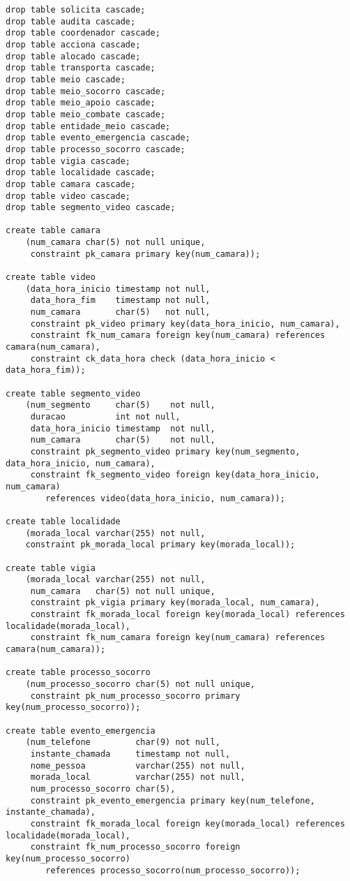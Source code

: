 \documentclass[10pt,a4paper]{article}
\begin{document}
\begin{verbatim}
drop table solicita cascade;
drop table audita cascade;
drop table coordenador cascade;
drop table acciona cascade;
drop table alocado cascade;
drop table transporta cascade;
drop table meio cascade;
drop table meio_socorro cascade;
drop table meio_apoio cascade;
drop table meio_combate cascade;
drop table entidade_meio cascade;
drop table evento_emergencia cascade;
drop table processo_socorro cascade;
drop table vigia cascade;
drop table localidade cascade;
drop table camara cascade;
drop table video cascade;
drop table segmento_video cascade;

create table camara 
    (num_camara char(5) not null unique,
     constraint pk_camara primary key(num_camara));

create table video
    (data_hora_inicio timestamp not null,
     data_hora_fim    timestamp not null,
     num_camara       char(5)   not null,
     constraint pk_video primary key(data_hora_inicio, num_camara),
     constraint fk_num_camara foreign key(num_camara) references camara(num_camara),
     constraint ck_data_hora check (data_hora_inicio < data_hora_fim));

create table segmento_video
    (num_segmento     char(5)    not null,
     duracao          int not null,
     data_hora_inicio timestamp  not null,
     num_camara       char(5)    not null,
     constraint pk_segmento_video primary key(num_segmento, data_hora_inicio, num_camara),
     constraint fk_segmento_video foreign key(data_hora_inicio, num_camara) 
        references video(data_hora_inicio, num_camara));

create table localidade
    (morada_local varchar(255) not null,
    constraint pk_morada_local primary key(morada_local));

create table vigia
    (morada_local varchar(255) not null,
     num_camara   char(5) not null unique,
     constraint pk_vigia primary key(morada_local, num_camara),
     constraint fk_morada_local foreign key(morada_local) references localidade(morada_local),
     constraint fk_num_camara foreign key(num_camara) references camara(num_camara));

create table processo_socorro
    (num_processo_socorro char(5) not null unique,
     constraint pk_num_processo_socorro primary key(num_processo_socorro));

create table evento_emergencia
    (num_telefone         char(9) not null,
     instante_chamada     timestamp not null,
     nome_pessoa          varchar(255) not null,
     morada_local         varchar(255) not null,
     num_processo_socorro char(5),
     constraint pk_evento_emergencia primary key(num_telefone, instante_chamada),
     constraint fk_morada_local foreign key(morada_local) references localidade(morada_local),
     constraint fk_num_processo_socorro foreign key(num_processo_socorro) 
        references processo_socorro(num_processo_socorro));


\end{verbatim}
\end{document}
